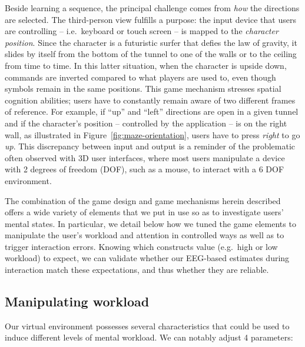 \documentclass[]{sigchi}
\begin{document}
Beside learning a sequence, the principal challenge comes from
\emph{how} the directions are selected. The third-person view fulfills a
purpose: the input device that users are controlling -- i.e.~keyboard or
touch screen -- is mapped to the \emph{character position}. Since the
character is a futuristic surfer that defies the law of gravity, it
slides by itself from the bottom of the tunnel to one of the walls or to
the ceiling from time to time. In this latter situation, when the
character is upside down, commands are inverted compared to what players
are used to, even though symbols remain in the same positions. This game
mechanism stresses spatial cognition abilities; users have to constantly
remain aware of two different frames of reference. For example, if
``up'' and ``left'' directions are open in a given tunnel and if the
character's position -- controlled by the application -- is on the right
wall, as illustrated in Figure~\ref{fig:maze-orientation}, users have to
press \emph{right} to go \emph{up}. This discrepancy between input and
output is a reminder of the problematic often observed with 3D user
interfaces, where most users manipulate a device with 2 degrees of
freedom (DOF), such as a mouse, to interact with a 6 DOF environment.

The combination of the game design and game mechanisms herein described
offers a wide variety of elements that we put in use so as to
investigate users' mental states. In particular, we detail below how we
tuned the game elements to manipulate the user's workload and attention
in controlled ways as well as to trigger interaction errors. Knowing
which constructs value (e.g.~high or low workload) to expect, we can
validate whether our EEG-based estimates during interaction match these
expectations, and thus whether they are reliable.

\subsection{Manipulating workload}\label{manipulating-workload}

Our virtual environment possesses several characteristics that could be
used to induce different levels of mental workload. We can notably
adjust 4 parameters:
\end{document}
